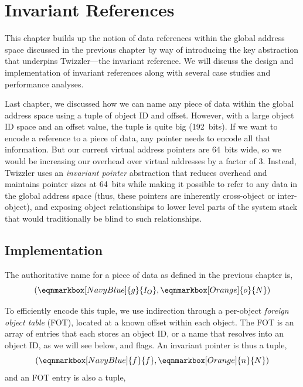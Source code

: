 
\chapter{Invariant References}\label{ch:invariant}

\begin{chabstract}
    This chapter builds up the notion of data references within the global address space discussed in the previous chapter by way of introducing the key abstraction that underpins
    Twizzler---the invariant reference. We will discuss the design and implementation of invariant references along with several case studies and performance analyses.
\end{chabstract}


Last chapter, we discussed how we can name any piece of data within the global address space using a tuple of object ID
and offset. However, with a large object ID space and an offset value, the tuple is quite big (192~bits). If we want to
encode a reference to a piece of data, any pointer needs to encode all that information. But our current virtual
address pointers are 64~bits wide, so we would be increasing our overhead over virtual addresses by a factor of 3.
Instead, Twizzler uses an \emph{invariant pointer} abstraction that reduces overhead and maintains pointer sizes at
64~bits while making it possible to refer to any data in the global address space (thus, these pointers are inherently
cross-object or inter-object), and exposing object relationships to lower level parts of the system stack that would
traditionally be blind to such relationships.

\section{Implementation}


The authoritative name for a piece of data as defined in the previous chapter is,
\begin{equation*}
    \left(
    \eqnmarkbox[NavyBlue]{g}{I_O}
    , \eqnmarkbox[Orange]{o}{N}\right)
\end{equation*}

To efficiently encode this tuple, we use indirection through a per-object \textit{foreign
    object table} (FOT), located at a known offset within each object. The FOT is an array of entries
that each stores an object ID, or a name that resolves into an object ID, as we will see
below, and flags. An invariant pointer is thus a tuple,
\begin{equation*}
    \left(
    \eqnmarkbox[NavyBlue]{f}{f}
    , \eqnmarkbox[Orange]{n}{N}\right)
\end{equation*}
and an FOT entry is also a tuple,

